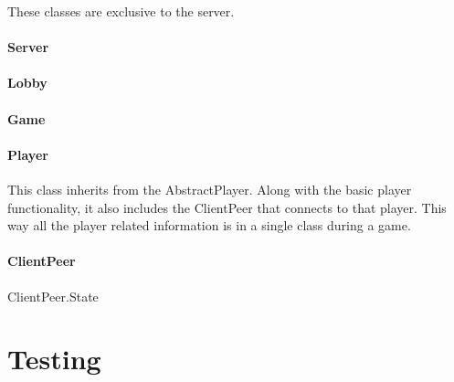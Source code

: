 \documentclass[12pt, letterpaper]{article}
\begin{document}
    These classes are exclusive to the server.


    \paragraph{Server}

    \paragraph{Lobby}

    \paragraph{Game}

    \paragraph{Player}
    This class inherits from the AbstractPlayer.
    Along with the basic player functionality, it also includes the ClientPeer that connects to that player.
    This way all the player related information is in a single class during a game.

    \paragraph{ClientPeer}

    ClientPeer.State


    \section{Testing}
    \label{sec:testing}


\end{document}

